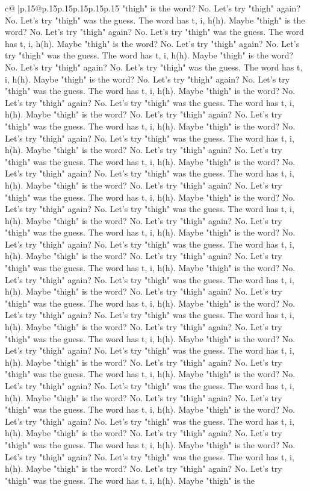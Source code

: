 \documentclass{article}
\begin{document}
{\begin{supertabular}{c@{$\;$}|p{.15\linewidth}@{}p{.15\linewidth}p{.15\linewidth}p{.15\linewidth}p{.15\linewidth}p{.15\linewidth}}
{{{"thigh" is the word? No. Let's try "thigh" again? No. Let's try "thigh" was the guess. The word has t, i, h(h). Maybe "thigh" is the word? No. Let's try "thigh" again? No. Let's try "thigh" was the guess. The word has t, i, h(h). Maybe "thigh" is the word? No. Let's try "thigh" again? No. Let's try "thigh" was the guess. The word has t, i, h(h). Maybe "thigh" is the word? No. Let's try "thigh" again? No. Let's try "thigh" was the guess. The word has t, i, h(h). Maybe "thigh" is the word? No. Let's try "thigh" again? No. Let's try "thigh" was the guess. The word has t, i, h(h). Maybe "thigh" is the word? No. Let's try "thigh" again? No. Let's try "thigh" was the guess. The word has t, i, h(h). Maybe "thigh" is the word? No. Let's try "thigh" again? No. Let's try "thigh" was the guess. The word has t, i, h(h). Maybe "thigh" is the word? No. Let's try "thigh" again? No. Let's try "thigh" was the guess. The word has t, i, h(h). Maybe "thigh" is the word? No. Let's try "thigh" again? No. Let's try "thigh" was the guess. The word has t, i, h(h). Maybe "thigh" is the word? No. Let's try "thigh" again? No. Let's try "thigh" was the guess. The word has t, i, h(h). Maybe "thigh" is the word? No. Let's try "thigh" again? No. Let's try "thigh" was the guess. The word has t, i, h(h). Maybe "thigh" is the word? No. Let's try "thigh" again? No. Let's try "thigh" was the guess. The word has t, i, h(h). Maybe "thigh" is the word? No. Let's try "thigh" again? No. Let's try "thigh" was the guess. The word has t, i, h(h). Maybe "thigh" is the word? No. Let's try "thigh" again? No. Let's try "thigh" was the guess. The word has t, i, h(h). Maybe "thigh" is the word? No. Let's try "thigh" again? No. Let's try "thigh" was the guess. The word has t, i, h(h). Maybe "thigh" is the word? No. Let's try "thigh" again? No. Let's try "thigh" was the guess. The word has t, i, h(h). Maybe "thigh" is the word? No. Let's try "thigh" again? No. Let's try "thigh" was the guess. The word has t, i, h(h). Maybe "thigh" is the word? No. Let's try "thigh" again? No. Let's try "thigh" was the guess. The word has t, i, h(h). Maybe "thigh" is the word? No. Let's try "thigh" again? No. Let's try "thigh" was the guess. The word has t, i, h(h). Maybe "thigh" is the word? No. Let's try "thigh" again? No. Let's try "thigh" was the guess. The word has t, i, h(h). Maybe "thigh" is the word? No. Let's try "thigh" again? No. Let's try "thigh" was the guess. The word has t, i, h(h). Maybe "thigh" is the word? No. Let's try "thigh" again? No. Let's try "thigh" was the guess. The word has t, i, h(h). Maybe "thigh" is the word? No. Let's try "thigh" again? No. Let's try "thigh" was the guess. The word has t, i, h(h). Maybe "thigh" is the word? No. Let's try "thigh" again? No. Let's try "thigh" was the guess. The word has t, i, h(h). Maybe "thigh" is the word? No. Let's try "thigh" again? No. Let's try "thigh" was the guess. The word has t, i, h(h). Maybe "thigh" is the word? No. Let's try "thigh" again? No. Let's try "thigh" was the guess. The word has t, i, h(h). Maybe "thigh" is the word? No. Let's try "thigh" again? No. Let's try "thigh" was the guess. The word has t, i, h(h). Maybe "thigh" is the }}}
\end{supertabular}}
\end{document}
